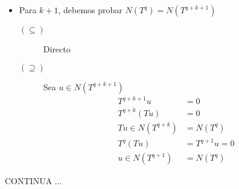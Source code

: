 \documentclass[10pt,a4paper]{article}
\begin{document}
\begin{itemize}
\begin{itemize}
			\item Para $k+1$, debemos probar $N\left(T^{q}\right) = N\left(T^{q+k+1}\right)$
				\begin{description}
					\item[$(\subseteq)$] Directo
					\item[$(\supseteq)$] Sea $u\in N\left(T^{q+k+1}\right)$
						\begin{align*}
							T^{q+k+1}u &= 0\\
							T^{q+k}(Tu) &= 0\\
							Tu \in N(T^{q+k}) & = N(T^{q})\\
							T^{q}(Tu) & = T^{q+1} u= 0 \\
							u \in N(T^{q+1}) &= N(T^{q})
						\end{align*}
				\end{description}
		\end{itemize}
\end{itemize}

CONTINUA ...
\end{document}
